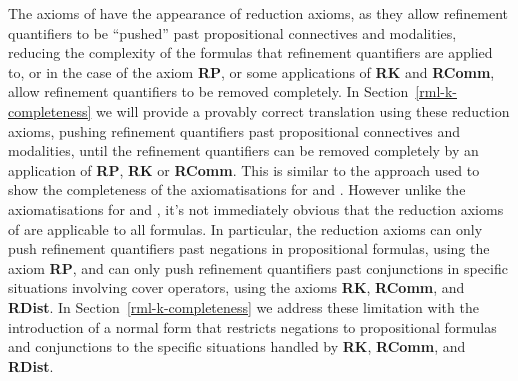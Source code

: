 The axioms of \logicRmlK{} have the appearance of reduction axioms, as they allow refinement quantifiers to be ``pushed'' past propositional connectives and modalities, reducing the complexity of the formulas that refinement quantifiers are applied to, or in the case of the axiom {\bf RP}, or some applications of {\bf RK} and {\bf RComm}, allow refinement quantifiers to be removed completely.
In Section~\ref{rml-k-completeness} we will provide a provably correct translation using these reduction axioms, pushing refinement quantifiers past propositional connectives and modalities, until the refinement quantifiers can be removed completely by an application of {\bf RP}, {\bf RK} or {\bf RComm}.
This is similar to the approach used to show the completeness of the axiomatisations for \logicAml{} and \logicPal{}.
However unlike the axiomatisations for \logicAml{} and \logicPal{}, it's not immediately obvious that the reduction axioms of \axiomRmlK{} are applicable to all \langRml{} formulas.
In particular, the reduction axioms can only push refinement quantifiers past negations in propositional formulas, using the axiom {\bf RP}, and can only push refinement quantifiers past conjunctions in specific situations involving cover operators, using the axioms {\bf RK}, {\bf RComm}, and {\bf RDist}.
In Section~\ref{rml-k-completeness} we address these limitation with the introduction of a normal form that restricts negations to propositional formulas and conjunctions to the specific situations handled by {\bf RK}, {\bf RComm}, and {\bf RDist}.

